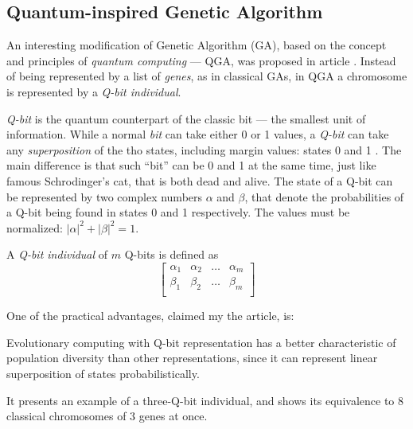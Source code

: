 \documentclass[../header]{subfiles}
\begin{document}
\providecommand{\rootdir}{..}



\subsection{Quantum-inspired Genetic Algorithm}
\label{sec:QGA}
An interesting modification of Genetic Algorithm (GA), based on the concept and
principles of \emph{quantum computing} --- QGA, was proposed in article
\cite{QuantumGeneticAlgorithm}.
Instead of being represented by a list of \emph{genes}, as in classical GAs,
in QGA a chromosome is represented by a \emph{Q-bit individual}.

\emph{Q-bit} is the quantum counterpart of the classic bit --- the smallest
unit of information. While a normal \emph{bit} can take either 0 or 1 values,
a \emph{Q-bit} can take any \emph{superposition} of the tho states, including
margin values: states 0 and 1 \cite{QuantumGeneticAlgorithm}.
The main difference is that such ``bit'' can be
0 and 1 at the same time, just like famous Schrodinger's cat, that is both dead
and alive. The state of a Q-bit can be represented by two complex numbers
$\alpha$ and $\beta$, that denote the probabilities of a Q-bit being found in
states 0 and 1 respectively.
The values must be normalized: $|\alpha|^2 + |\beta|^2 = 1$.

A \emph{Q-bit individual} of $m$ Q-bits is defined as
\begin{equation}
\left[
  \begin{array}{cccc}
  \alpha_1 & \alpha_2 & \dots & \alpha_m \\
  \beta_1  & \beta_2  & \dots & \beta_m  \\
  \end{array}
\right]
\end{equation}

One of the practical advantages, claimed my the article, is:
\begin{displayquote}
  Evolutionary computing with Q­-bit representation has a better characteristic
  of population diversity than other representations, since it can represent
  linear superposition of states probabilistically.
\end{displayquote}
It presents an example of a three-Q-bit individual, and shows its equivalence
to 8 classical chromosomes of 3 genes at once.
\end{document}
